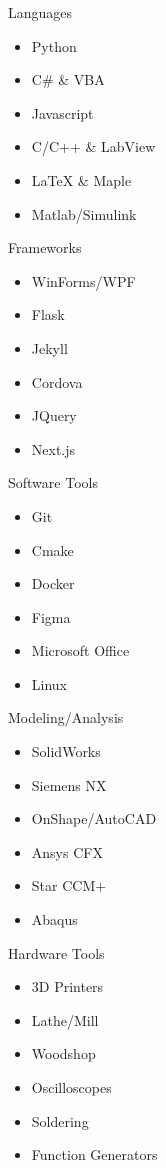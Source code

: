 \begin{minipage}{\dimexpr\textwidth-2ex}
{\begin{multicols}{5}%
    {\color{cblue} Languages}
    \begin{itemize}[topsep=3pt,label=\textcolor{blue}{\textbullet},leftmargin=*]
        \itemsep-0.2em 
        \item Python
        \item C\# \& VBA
        \item Javascript
        \item C/C++ \& LabView
        \item LaTeX \& Maple
        \item Matlab/Simulink
    \end{itemize}
    \columnbreak
    {\color{cblue} Frameworks}
    \begin{itemize}[topsep=3pt,label=\textcolor{blue}{\textbullet},leftmargin=*]
        \itemsep-0.2em 
        \item WinForms/WPF
        \item Flask
        \item Jekyll
        \item Cordova
        \item JQuery
        \item Next.js
    \end{itemize}
    \columnbreak
    {\color{cblue} Software Tools}
    \begin{itemize}[topsep=3pt,label=\textcolor{blue}{\textbullet},leftmargin=*]
        \itemsep-0.2em 
        \item Git
        \item Cmake
        \item Docker
        \item Figma
        \item Microsoft Office
        \item Linux
    \end{itemize}
    \columnbreak
    {\color{cblue} Modeling/Analysis}
    \begin{itemize}[topsep=3pt,label=\textcolor{blue}{\textbullet},leftmargin=*]
        \itemsep-0.2em 
        \item SolidWorks
        \item Siemens NX
        \item OnShape/AutoCAD
        \item Ansys CFX
        \item Star CCM+
        \item Abaqus
    \end{itemize}
    \columnbreak
    {\color{cblue} Hardware Tools}
    \begin{itemize}[topsep=3pt,label=\textcolor{blue}{\textbullet},leftmargin=*]
        \itemsep-0.2em 
        \item 3D Printers
        \item Lathe/Mill
        \item Woodshop
        \item Oscilloscopes
        \item Soldering
        \item Function Generators
    \end{itemize}


\end{multicols}}
\end{minipage}
